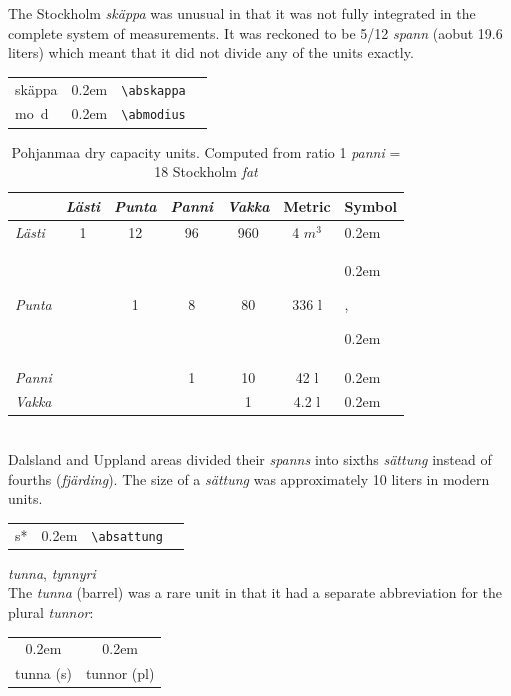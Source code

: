 \documentclass[a4paper]{article}
\newcommand{\samplefont}{\fontsize{16}{16}\abcursivefamily\spaceskip0.2em}
\newcommand{\sample}[1]{{\samplefont #1 \strut}}
\newcommand{\ltxncmd}[1]{\texttt{\textbackslash{}#1}}
\begin{document}
\begin{description}
  The Stockholm \emph{skäppa} was unusual in that it was not
  fully integrated in the complete system of measurements. It was
  reckoned to be 5/12 \emph{spann} (aobut 19.6 liters) which meant
  that it did not divide any of the units exactly.
  \begin{center}
    \begin{tabular}{llll}
      {}skäppa & \sample{\abskappa} & \ltxncmd{abskappa} \\
      {}mo~d & \sample{\abmodius} & \ltxncmd{abmodius} \\
    \end{tabular}
  \end{center}

  \begin{table}
    \centering
    \begin{tabular}{lcccc|cl}
      &              \emph{Lästi} & \emph{Punta} & \emph{Panni} &
      \emph{Vakka} & Metric & Symbol \\
      \hline
      \emph{Lästi}  &  1  &  12  &  96  & 960 &     4 $m^3$ & \sample{\ablast}\\
      \emph{Punta}  &     &   1  &   8  &  80 &    336 l  &  \sample{\abpund}, \sample{\abpundthree}  \\
      \emph{Panni}  &     &      &   1  &  10 &     42 l  &       \sample{\abspann} \\
      \emph{Vakka}  &     &      &      &   1 &    4.2 l  & \sample{\abvakka} \\
    \end{tabular}
    \caption{Pohjanmaa dry capacity units. Computed from ratio 1
      \emph{panni} = 18 Stockholm \emph{fat}}
    \label{tab:pohjanmaa_volume}
  \end{table}



\item [\sample{\absattung} \emph{sättung} ] \mbox{} \\
  Dalsland and Uppland areas divided their \emph{spanns} into sixths
  \emph{sättung} instead of fourths (\emph{fjärding}). The size of a
  \emph{sättung} was approximately 10 liters in modern units. 
  \begin{center}
    \begin{tabular}{llll}
      {}s* & \sample{\absattung} & \ltxncmd{absattung} \\
    \end{tabular}
  \end{center}

\item [\sample{\abtunna}, \sample{\abtunnor}] \emph{tunna}, \emph{tynnyri} \mbox{} \\
  The \emph{tunna} (barrel) was a rare unit in that it had a separate
  abbreviation for the plural \emph{tunnor}:
  \begin{center}
    \begin{tabular}{cc}
      \sample{\abtunna} & \sample{\abtunnor} \\
      tunna (s) & tunnor (pl) \\
    \end{tabular}
  \end{center}


\end{description}
\end{document}
